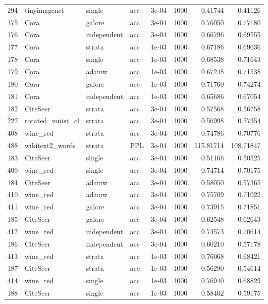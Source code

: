 \begin{longtable}{rlllrrrr}
294 & tinyimagenet & single & acc & 3e-04 & 1000 & 0.41744 & 0.41126 \\
175 & Cora & galore & acc & 3e-04 & 1000 & 0.76050 & 0.77180 \\
176 & Cora & independent & acc & 3e-04 & 1000 & 0.66796 & 0.69555 \\
\rowcolor{oursbg}
177 & Cora & strata & acc & 1e-03 & 1000 & 0.67186 & 0.69636 \\
178 & Cora & single & acc & 1e-03 & 1000 & 0.68538 & 0.71643 \\
179 & Cora & adamw & acc & 1e-03 & 1000 & 0.67248 & 0.71538 \\
180 & Cora & galore & acc & 1e-03 & 1000 & 0.71760 & 0.74274 \\
181 & Cora & independent & acc & 1e-03 & 1000 & 0.65686 & 0.67054 \\
\rowcolor{oursbg}
182 & CiteSeer & strata & acc & 3e-04 & 1000 & 0.57568 & 0.56758 \\
222 & rotated\_mnist\_cl & strata & acc & 3e-04 & 1000 & 0.56998 & 0.57354 \\
\rowcolor{oursbg}
408 & wine\_red & strata & acc & 3e-04 & 1000 & 0.74786 & 0.70776 \\
488 & wikitext2\_words & strata & PPL & 3e-04 & 1000 & 115.81714 & 108.71847 \\
183 & CiteSeer & single & acc & 3e-04 & 1000 & 0.51166 & 0.50525 \\
409 & wine\_red & single & acc & 3e-04 & 1000 & 0.74714 & 0.70175 \\
184 & CiteSeer & adamw & acc & 3e-04 & 1000 & 0.58050 & 0.57365 \\
410 & wine\_red & adamw & acc & 3e-04 & 1000 & 0.75709 & 0.71022 \\
411 & wine\_red & galore & acc & 3e-04 & 1000 & 0.73915 & 0.71851 \\
185 & CiteSeer & galore & acc & 3e-04 & 1000 & 0.62548 & 0.62643 \\
412 & wine\_red & independent & acc & 3e-04 & 1000 & 0.74573 & 0.70614 \\
186 & CiteSeer & independent & acc & 3e-04 & 1000 & 0.60210 & 0.57178 \\
\rowcolor{oursbg}
413 & wine\_red & strata & acc & 1e-03 & 1000 & 0.76068 & 0.68421 \\
187 & CiteSeer & strata & acc & 1e-03 & 1000 & 0.56290 & 0.54614 \\
414 & wine\_red & single & acc & 1e-03 & 1000 & 0.76940 & 0.68829 \\
188 & CiteSeer & single & acc & 1e-03 & 1000 & 0.58402 & 0.59175 \\

\end{longtable}
